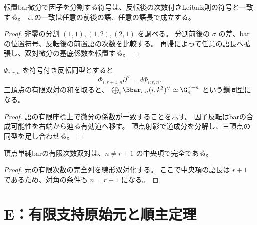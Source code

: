 \begin{lemma}[全ての語長での符号と転置]\label{lem:all-length-sign}
\leanok
{}
転置bar微分で因子を分割する符号は、反転後の次数付きLeibniz則の符号と一致する。
この一致は任意の前後の語、任意の語長で成立する。
\end{lemma}
\begin{proof}\leanok
非零の分割 $(1,1),(1,2),(2,1)$ を調べる。
分割前後の $\sigma$ の差、barの位置符号、反転後の前置語の次数を比較する。
再帰によって任意の語長へ拡張し、双対微分の基底係数を転置する。
\end{proof}

\begin{theorem}[内部次数別の実際の鎖同型]\label{thm:chain-isomorphism}
\leanok
{}
$\Phi_{i;r,n}$ を符号付き反転同型とすると
\[
 \Phi_{i;r+1,n}\partial^\vee=d\Phi_{i;r,n}.
\]
三頂点の有限双対の和を取ると、
$\bigoplus_i\Bbar_{r,n}(i,k^3)^\vee\simeq\G_n^{\,r-n}$ という鎖同型になる。
\end{theorem}
\begin{proof}\leanok
語の有限座標上で微分の係数が一致することを示す。
因子反転はbarの合成可能性を右端から辿る有効道へ移す。
頂点射影で道成分を分解し、三頂点の同型を足し合わせる。
\end{proof}

\begin{lemma}[対角外の双対完全性]\label{lem:dual-exact}
\leanok
{}
頂点単純barの有限次数双対は、$n\ne r+1$ の中央項で完全である。
\end{lemma}
\begin{proof}\leanok
元の有限次数の完全列を線形双対化する。
ここで中央項の語長は $r+1$ であるため、対角の条件も $n=r+1$ になる。
\end{proof}

\section{E：有限支持原始元と順主定理}

